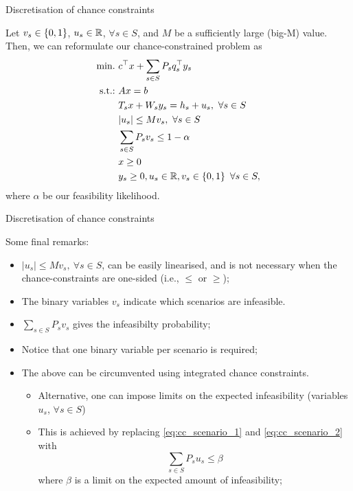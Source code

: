 \begin{frame}{Discretisation of chance constraints}

	Let $v_s \in \left\{ 0,1 \right \}$, $u_s \in \mathbb R$, $\forall s \in S$, and $M$ be a sufficiently large (big-M) value. Then, we can reformulate our chance-constrained problem as
	\pause
	\begin{subequations} 
		\begin{align}
			\mathop{\text{min.} \ }  & c^\top x + \sum_{s\in S} P_s q_s^\top y_s \\
			\mathop{\text{s.t.:} \ }	   & Ax = b \\
				   & T_sx + W_s y_s = h_s + u_s, \ \forall s \in S \\
				   & |u_s| \le Mv_s, \ \forall s \in S  \label{eq:cc_scenario_1}\\ 
				   & \sum_{s \in S} P_s v_s \le 1-\alpha \label{eq:cc_scenario_2} \\
				   & x \ge 0 \\
				   & y_s \ge 0, u_s \in \mathbb R, v_s \in \left\{ 0,1 \right \}  \ \forall s \in S,
		\end{align}
	\end{subequations}
	where $\alpha$ be our \alert{feasibility likelihood}. 
	
\end{frame}


\begin{frame}{Discretisation of chance constraints}

	Some final remarks:
	\vspace{-6pt}
	\begin{itemize}[<+->]
		\item $|u_s| \le Mv_s, \ \forall s \in S$, can be easily linearised, and is not necessary when the chance-constraints are one-sided (i.e., $\le$ or $\ge$);
		\item The binary variables $v_s$ indicate which scenarios are \alert{infeasible}.
		\item $\sum_{s \in S} P_s v_s$ gives the \alert{infeasibilty probability};
		\item Notice that one \alert{binary variable} per scenario is required;
		\item The above can be circumvented using \alert{integrated chance constraints}. 
		\begin{itemize}
			\item Alternative, one can impose limits on the \alert{expected infeasibility} (variables $u_s$, $\forall s \in S$)
			\item This is achieved by replacing \eqref{eq:cc_scenario_1} and \eqref{eq:cc_scenario_2} with
			   \begin{equation*}
				   \sum_{s \in S} P_s u_s \le \beta
			   \end{equation*}
			   where $\beta$ is a limit on the expected amount of infeasibility;	   
		\end{itemize}
	\end{itemize}
	
\end{frame}


